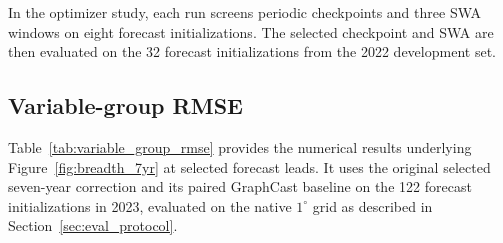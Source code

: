 \documentclass{article}
\newcommand{\vfourchange}[1]{{\color{blue}#1}}
\begin{document}
In the optimizer study, each run screens periodic checkpoints and three SWA windows on eight forecast initializations. The selected checkpoint and SWA are then evaluated on the \vfourchange{32 forecast initializations from the 2022 development set}.

\subsection{Variable-group RMSE}
\label{app:variable_group_rmse}

Table~\ref{tab:variable_group_rmse} provides the numerical results underlying Figure~\ref{fig:breadth_7yr} at selected forecast leads. It uses the \vfourchange{original selected} seven-year correction and its paired GraphCast baseline on the \vfourchange{122 forecast initializations in 2023}, evaluated on the native $1^\circ$ grid as described in Section~\ref{sec:eval_protocol}.
\end{document}
